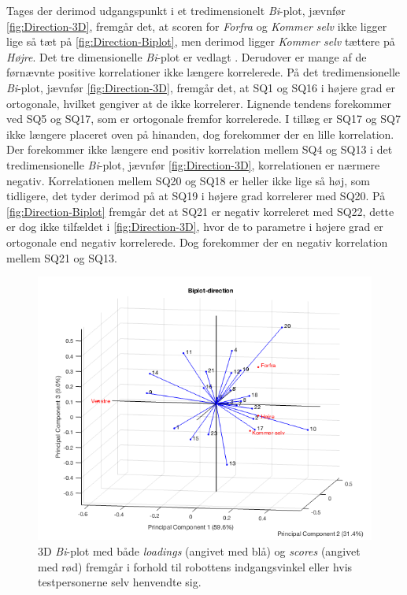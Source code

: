 \noindent
%
Tages der derimod udgangspunkt i et tredimensionelt \textit{Bi}-plot, jævnfør \autoref{fig:Direction-3D}, fremgår det, at scoren for \textit{Forfra} og \textit{Kommer selv} ikke ligger lige så tæt på \autoref{fig:Direction-Biplot}, men derimod ligger \textit{Kommer selv} tættere på \textit{Højre}. Det tre dimensionelle \textit{Bi}-plot er vedlagt . Derudover er mange af de førnævnte positive korrelationer ikke længere korrelerede. På det tredimensionelle \textit{Bi}-plot, jævnfør \autoref{fig:Direction-3D}, fremgår det, at SQ1 og SQ16 i højere grad er ortogonale, hvilket gengiver at de ikke korrelerer. Lignende tendens forekommer ved SQ5 og SQ17, som er ortogonale fremfor korrelerede. I tillæg er SQ17 og SQ7 ikke længere placeret oven på hinanden, dog forekommer der en lille korrelation. Der forekommer ikke længere end positiv korrelation mellem SQ4 og SQ13 i det tredimensionelle \textit{Bi}-plot, jævnfør \autoref{fig:Direction-3D}, korrelationen er nærmere negativ. Korrelationen mellem SQ20 og SQ18 er heller ikke lige så høj, som tidligere, det tyder derimod på at SQ19 i højere grad korrelerer med SQ20. På \autoref{fig:Direction-Biplot} fremgår det at SQ21 er negativ korreleret med SQ22, dette er dog ikke tilfældet i \autoref{fig:Direction-3D}, hvor de to parametre i højere grad er ortogonale end negativ korrelerede. Dog forekommer der en negativ korrelation mellem SQ21 og SQ13.
%
\begin{figure}[H]
\centering
\includegraphics[width=\textwidth]{Figure/DatabehandlingSkalaer/PCAfigures/Direction-3D.png}
\caption{3D \textit{Bi}-plot med både \textit{loadings} (angivet med blå) og \textit{scores} (angivet med rød) fremgår i forhold til robottens indgangsvinkel eller hvis testpersonerne selv henvendte sig.}
\label{fig:Direction-3D}
\end{figure}
%


